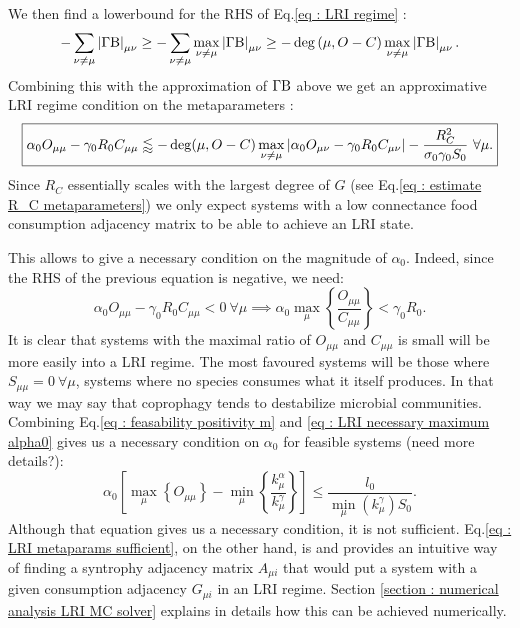 \documentclass[12pt]{report}
\begin{document}
We then find a lowerbound for the RHS of Eq.\eqref{eq : LRI regime} :
\begin{equation}
-\sum_{\nu\neq\mu}\left|{\Gamma\text{B}}\right|_{\mu\nu} \geq - \sum_{\nu \neq \mu} \max_{\nu \neq \mu} \left|{\Gamma\text{B}}\right|_{\mu\nu} \geq - \deg\left(\mu, O-C \right) \max_{\nu \neq \mu} \left|{\Gamma\text{B}}\right|_{\mu\nu}.
\end{equation}
Combining this with the approximation of $\Gamma\text{B}$ above we get an approximative LRI regime condition on the metaparameters :
\begin{equation}\boxed{
\alpha_0 O_{\mu \mu}-\gamma_0R_0 C_{\mu\mu} \lessapprox - \deg(\mu, O-C) \max_{\nu\neq\mu}\left|{\alpha_0 O_{\mu \nu}-\gamma_0 R_0 C_{\mu\nu}}\right|-\frac{R_C^2}{\sigma_0\gamma_0 S_0} \ \forall \mu.
}\label{eq : LRI metaparams sufficient}
\end{equation}
Since $R_C$ essentially scales with the largest degree of $G$ (see Eq.\ref{eq : estimate R_C metaparameters}) we only expect systems with a low connectance food consumption adjacency matrix to be able to achieve an LRI state.

This allows to give a necessary condition on the magnitude of $\alpha_0$. Indeed, since the RHS of the previous equation is negative, we need:
\begin{equation}
\alpha_0 O_{\mu \mu}-\gamma_0 R_0 C_{\mu\mu} < 0 \ \forall \mu \implies {\alpha_0 \max_\mu \left\{ \frac{O_{\mu\mu}}{C_{\mu\mu}}  \right\} < \gamma_0 R_0 .} \label{eq : LRI necessary maximum alpha0}
\end{equation}
It is clear that systems with the maximal ratio of $O_{\mu\mu}$ and $C_{\mu\mu}$ is small will be more easily into a LRI regime. The most favoured systems will be those where $S_{\mu\mu}=0 \ \forall \mu$, \ie systems where no species consumes what it itself produces. In that way we may say that coprophagy tends to destabilize microbial communities.
Combining Eq.\eqref{eq : feasability positivity m} and \eqref{eq : LRI necessary maximum alpha0} gives us a necessary condition on $\alpha_0$ for feasible systems (need more details?):
\begin{equation}
\boxed{
\alpha_0 \left[\max_\mu \left\{O_{\mu\mu}\right\}-\min_\mu \left\{ \frac{k^\alpha_\mu}{k^\gamma_\mu} \right\} \right] \leq \frac{l_0}{\min_\mu\left(k_\mu^\gamma\right)S_0}}.
\end{equation}
Although that equation gives us a necessary condition, it is not sufficient. Eq.\eqref{eq : LRI metaparams sufficient}, on the other hand, is and provides an intuitive way of finding a syntrophy adjacency matrix $A_{\mu i}$ that would put a system with a given consumption adjacency $G_{\mu i}$ in an LRI regime. Section \ref{section : numerical analysis LRI MC solver} explains in details how this can be achieved numerically.
\end{document}
